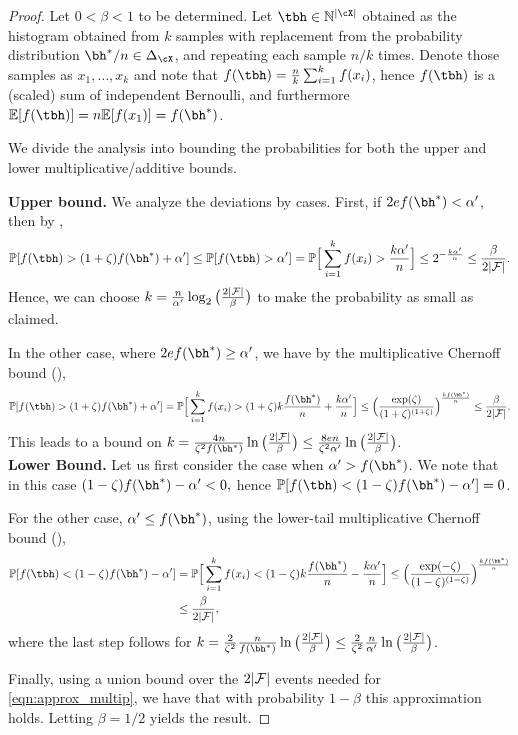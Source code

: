 \begin{proof} Let $0<\beta<1$ to be determined. Let $\tbh\in\mathbb{N}^{|\cX|}$ obtained as the histogram obtained from $k$ samples with replacement from the probability distribution $\bh^{\ast}/n\in \Delta_{\cX}$, and repeating each sample $n/k$ times. Denote those samples as $x_1,\ldots,x_k$ and note that $f(\tbh)=\frac{n}{k}\sum_{i=1}^k f(x_i)$, hence $f(\tbh)$ is a (scaled) sum of independent Bernoulli, and furthermore $\mathbb{E}[f(\tbh)]=n\mathbb{E}[f(x_1)]=f(\bh^{\ast})$.

We divide the analysis into bounding the probabilities for both the upper and lower multiplicative/additive  bounds.

\noindent\textbf{Upper bound.} We analyze the deviations by cases. First, if $2ef(\bh^{\ast}) < \alpha'$, then by ,
\[
\mathbb{P}[ f(\tbh) >(1+\zeta)f(\bh^{\ast})+\alpha'] \leq \mathbb{P}[ f(\tbh) >\alpha'] 
= \mathbb{P}\Big[ \sum_{i=1}^k f(x_i) >\frac{k\alpha'}{n} \Big] 
\leq 2^{-\frac{k\alpha'}{n}} \leq \frac{\beta}{2|{\cal F}|}.
\]
Hence, we can choose $k = \frac{n}{\alpha'}\log_2\big(\frac{2|{\cal F}|}{\beta}\big)$ to make the probability as small as claimed.

In the other case, where $2ef(\bh^{\ast}) \geq \alpha'$, we have by the multiplicative Chernoff bound (),
\[
\mathbb{P}[f(\tbh) >(1+\zeta)f(\bh^{\ast})+\alpha'] = 
\mathbb{P}\Big[\sum_{i=1}^k f(x_i) >(1+\zeta)k\frac{f(\bh^{\ast})}{n}+\frac{k\alpha'}{n}\Big] \\
\leq \Big(\frac{\exp(\zeta)}{(1+\zeta)^{(1+\zeta)}}\Big)^{\frac{kf(\bh^{\ast})}{n}}\leq \frac{\beta}{2|{\cal F}|}.
\]
This leads to a bound on $k=\frac{4n}{\zeta^2f(\bh^{\ast})}\ln\big(\frac{2|{\cal F}|}{\beta}\big)\leq \frac{8en}{\zeta^2 \alpha'}\ln\big(\frac{2|{\cal F}|}{\beta}\big)$.\\

\noindent\textbf{Lower Bound.} Let us first consider the case when $\alpha'>f(\bh^{\ast})$. We note that in this case $(1-\zeta)f(\bh^{\ast})-\alpha'<0,$ 
hence $\mathbb{P}[f(\tbh) < (1-\zeta)f(\bh^{\ast})-\alpha']=0$.

For the other case, $\alpha'\leq f(\bh^{\ast})$, using the lower-tail  multiplicative Chernoff bound (),
\begin{align*}
\mathbb{P}[f(\tbh) < (1-\zeta)f(\bh^{\ast})-\alpha'] &= \mathbb{P}\Big[\sum_{i=1}^k f(x_i) <(1-\zeta)k\frac{f(\bh^{\ast})}{n}-\frac{k\alpha'}{n}\Big] 
\leq \Big(\frac{\exp(-\zeta)}{(1-\zeta)^{(1-\zeta)}}\Big)^{\frac{kf(\bh^{\ast})}{n}} \\
&\leq \frac{\beta}{2|{\cal F}|},
\end{align*}
where the last step follows for $k=\frac{2}{\zeta^2}\frac{n}{f(\bh^{\ast})}\ln\big(\frac{2|{\cal F}|}{\beta}\big)\leq \frac{2}{\zeta^2}\frac{n}{\alpha'}\ln\big(\frac{2|{\cal F}|}{\beta}\big)$. 

Finally, using a union bound over the $2|{\cal F}|$ events needed for \eqref{eqn:approx_multip}, we have that with probability $1-\beta$ this approximation holds. Letting $\beta=1/2$ yields the result.
\end{proof}

